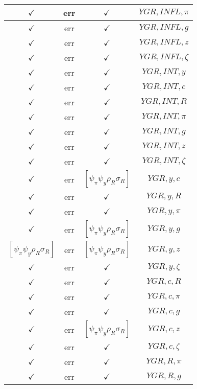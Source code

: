 \documentclass[a4paper,10pt]{article}
\begin{document}
\begin{longtable}{|c|c|c|c|}
\hline
$\checkmark$ & err & $\checkmark$ & ${YGR},{INFL},{\pi}$ \\
\hline
$\checkmark$ & err & $\checkmark$ & ${YGR},{INFL},{g}$ \\
\hline
$\checkmark$ & err & $\checkmark$ & ${YGR},{INFL},{z}$ \\
\hline
$\checkmark$ & err & $\checkmark$ & ${YGR},{INFL},{\zeta}$ \\
\hline
$\checkmark$ & err & $\checkmark$ & ${YGR},{INT},{y}$ \\
\hline
$\checkmark$ & err & $\checkmark$ & ${YGR},{INT},{c}$ \\
\hline
$\checkmark$ & err & $\checkmark$ & ${YGR},{INT},{R}$ \\
\hline
$\checkmark$ & err & $\checkmark$ & ${YGR},{INT},{\pi}$ \\
\hline
$\checkmark$ & err & $\checkmark$ & ${YGR},{INT},{g}$ \\
\hline
$\checkmark$ & err & $\checkmark$ & ${YGR},{INT},{z}$ \\
\hline
$\checkmark$ & err & $\checkmark$ & ${YGR},{INT},{\zeta}$ \\
\hline
$\checkmark$ & err & $[\psi_\pi \psi_y \rho_R \sigma_R ]$ & ${YGR},{y},{c}$ \\
\hline
$\checkmark$ & err & $\checkmark$ & ${YGR},{y},{R}$ \\
\hline
$\checkmark$ & err & $\checkmark$ & ${YGR},{y},{\pi}$ \\
\hline
$\checkmark$ & err & $[\psi_\pi \psi_y \rho_R \sigma_R ]$ & ${YGR},{y},{g}$ \\
\hline
$[\psi_\pi \psi_y \rho_R \sigma_R ]$ & err & $[\psi_\pi \psi_y \rho_R \sigma_R ]$ & ${YGR},{y},{z}$ \\
\hline
$\checkmark$ & err & $\checkmark$ & ${YGR},{y},{\zeta}$ \\
\hline
$\checkmark$ & err & $\checkmark$ & ${YGR},{c},{R}$ \\
\hline
$\checkmark$ & err & $\checkmark$ & ${YGR},{c},{\pi}$ \\
\hline
$\checkmark$ & err & $\checkmark$ & ${YGR},{c},{g}$ \\
\hline
$\checkmark$ & err & $[\psi_\pi \psi_y \rho_R \sigma_R ]$ & ${YGR},{c},{z}$ \\
\hline
$\checkmark$ & err & $\checkmark$ & ${YGR},{c},{\zeta}$ \\
\hline
$\checkmark$ & err & $\checkmark$ & ${YGR},{R},{\pi}$ \\
\hline
$\checkmark$ & err & $\checkmark$ & ${YGR},{R},{g}$ \\

\end{longtable}
\end{document}
